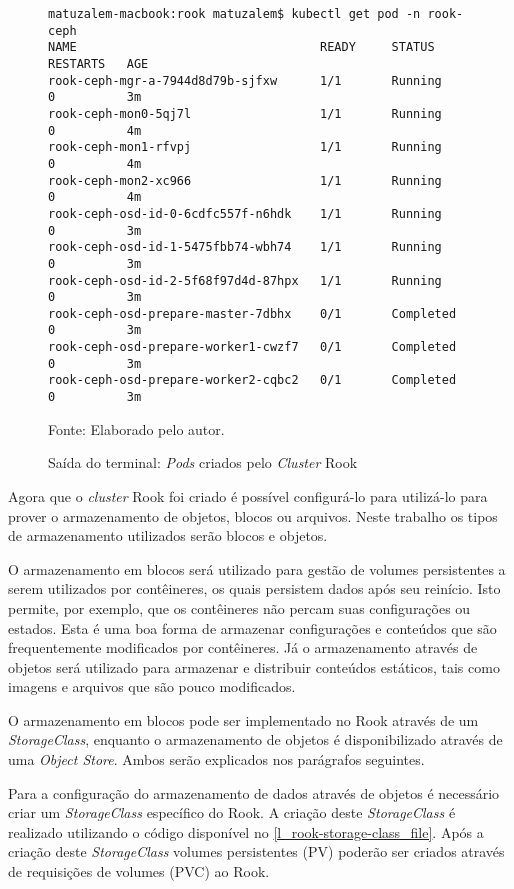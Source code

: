 \begin{figure}[!htpb]
	\centering
	\caption{Saída do terminal: \textit{Pods} criados pelo \textit{Cluster} Rook}
    \begin{verbatim}
matuzalem-macbook:rook matuzalem$ kubectl get pod -n rook-ceph
NAME                                  READY     STATUS      RESTARTS   AGE
rook-ceph-mgr-a-7944d8d79b-sjfxw      1/1       Running     0          3m
rook-ceph-mon0-5qj7l                  1/1       Running     0          4m
rook-ceph-mon1-rfvpj                  1/1       Running     0          4m
rook-ceph-mon2-xc966                  1/1       Running     0          4m
rook-ceph-osd-id-0-6cdfc557f-n6hdk    1/1       Running     0          3m
rook-ceph-osd-id-1-5475fbb74-wbh74    1/1       Running     0          3m
rook-ceph-osd-id-2-5f68f97d4d-87hpx   1/1       Running     0          3m
rook-ceph-osd-prepare-master-7dbhx    0/1       Completed   0          3m
rook-ceph-osd-prepare-worker1-cwzf7   0/1       Completed   0          3m
rook-ceph-osd-prepare-worker2-cqbc2   0/1       Completed   0          3m
    \end{verbatim}
	Fonte: Elaborado pelo autor.
 	\label{rook_cluster_pods}
\end{figure}

Agora que o \textit{cluster} Rook foi criado é possível configurá-lo para utilizá-lo para prover o armazenamento de objetos, blocos ou arquivos. Neste trabalho os tipos de armazenamento utilizados serão blocos e objetos.

O armazenamento em blocos será utilizado para gestão de volumes persistentes a serem utilizados por contêineres, os quais persistem dados após seu reinício. Isto permite, por exemplo, que os contêineres não percam suas configurações ou estados. Esta é uma boa forma de armazenar configurações e conteúdos que são frequentemente modificados por contêineres. Já o armazenamento através de objetos será utilizado para armazenar e distribuir conteúdos estáticos, tais como imagens e arquivos que são pouco modificados.

O armazenamento em blocos pode ser implementado no Rook através de um \textit{StorageClass}, enquanto o armazenamento de objetos é disponibilizado através de uma \textit{Object Store}. Ambos serão explicados nos parágrafos seguintes.

Para a configuração do armazenamento de dados através de objetos é necessário criar um \textit{StorageClass} específico do Rook. A criação deste \textit{StorageClass} é realizado utilizando o código disponível no \autoref{l_rook-storage-class_file}. Após a criação deste \textit{StorageClass} volumes persistentes (\ac{PV}) poderão ser criados através de requisições de volumes (\ac{PVC}) ao Rook.

